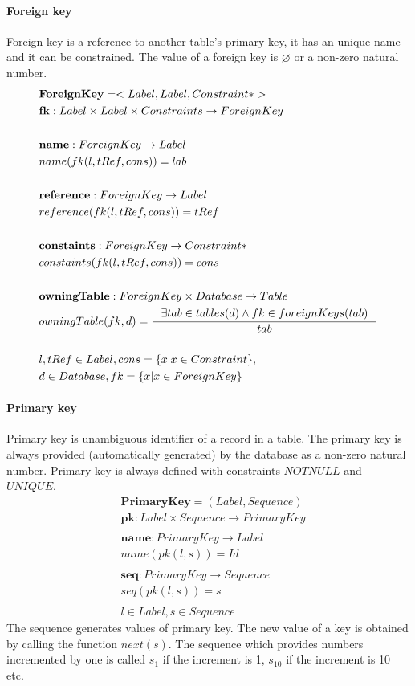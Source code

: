 \documentclass[11pt]{article}
\begin{document}
\paragraph{Foreign key} Foreign key is a reference to another table's primary key, it has an unique name and it can be constrained. The value of a foreign key is $\varnothing$ or a non-zero natural number.
\begin{align*}
&	\mathbf{ForeignKey} = < Label, Label, Constraint*> \\ 
&	\mathbf{fk} : Label \times Label \times Constraints \rightarrow ForeignKey \\ \\
&	\mathbf{name} : ForeignKey \rightarrow Label \\
&	name(fk(l, tRef, cons)) = lab  \\ \\
&	\mathbf{reference} : ForeignKey \rightarrow Label  \\
&	reference(fk(l, tRef, cons)) = tRef  \\ \\
&	\mathbf{constaints} : ForeignKey \rightarrow Constraint*  \\
&	constaints(fk(l, tRef, cons)) = cons  \\ \\
&	\mathbf{owningTable} : ForeignKey \times Database \rightarrow Table  \\
&	owningTable(fk, d) = \inference{\exists tab \in tables(d) \wedge fk \in foreignKeys(tab)}{tab}\\\\
&	l, tRef \in Label, cons  = \{ x | x \in Constraint\}, \\ 
& d \in Database, fk = \{ x | x \in ForeignKey\}
\end{align*}


\paragraph{Primary key} Primary key is unambiguous identifier of a record in a table. The primary key is always provided (automatically generated) by the database as a non-zero natural number. Primary key is always defined with constraints $NOTNULL$ and $UNIQUE$. 
\begin{align*}
&	\mathbf{PrimaryKey} =  ( Label, Sequence ) 	\\
&	\mathbf{pk} : Label \times Sequence \rightarrow PrimaryKey \\\\
&	\mathbf{name} : PrimaryKey \rightarrow Label \\
&	name(pk(l, s)) = Id \\\\
&	\mathbf{seq} : PrimaryKey \rightarrow Sequence \\
&   seq(pk(l,s)) = s \\\\
& l \in Label, s \in Sequence
\end{align*}
The sequence generates values of primary key. The new value of a key is obtained by calling the function $next(s)$. The sequence which provides numbers incremented by one is called $s_1$ if the increment is 1, $s_{10}$ if the increment is 10 etc.
\end{document}
